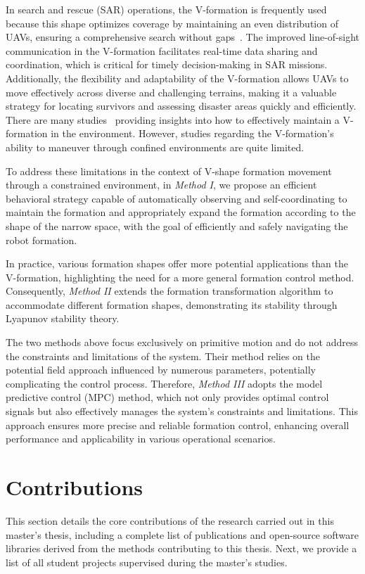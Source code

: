 In search and rescue (SAR) operations, the V-formation is frequently used because this shape optimizes coverage by maintaining an even distribution of UAVs, ensuring a comprehensive search without gaps~\cite{Dang2019,Mirzaeinia2019,8793765}. The improved line-of-sight communication in the V-formation facilitates real-time data sharing and coordination, which is critical for timely decision-making in SAR missions. Additionally, the flexibility and adaptability of the V-formation allows UAVs to move effectively across diverse and challenging terrains, making it a valuable strategy for locating survivors and assessing disaster areas quickly and efficiently. There are many studies~\cite{Dang2019,9990236,Zhang2019} providing insights into how to effectively maintain a V-formation in the environment. However, studies regarding the V-formation’s ability to maneuver through confined environments are quite limited.

To address these limitations in the context of V-shape formation movement through a constrained environment, in \textit{Method I}, we propose an efficient behavioral strategy capable of automatically observing and self-coordinating to maintain the formation and appropriately expand the formation according to the shape of the narrow space, with the goal of efficiently and safely navigating the robot formation.

In practice, various formation shapes offer more potential applications than the V-formation, highlighting the need for a more general formation control method. Consequently, \textit{Method II} extends the formation transformation algorithm to accommodate different formation shapes, demonstrating its stability through Lyapunov stability theory.

The two methods above focus exclusively on primitive motion and do not address the constraints and limitations of the system. Their method relies on the potential field approach influenced by numerous parameters, potentially complicating the control process. Therefore, \textit{Method III} adopts the model predictive control (MPC) method, which not only provides optimal control signals but also effectively manages the system's constraints and limitations. This approach ensures more precise and reliable formation control, enhancing overall performance and applicability in various operational scenarios.

\section{Contributions}
This section details the core contributions of the research carried out in this master's thesis, including a complete list of publications and open-source software libraries derived from the methods contributing to this thesis. Next, we provide a list of all student projects supervised during the master's studies.

